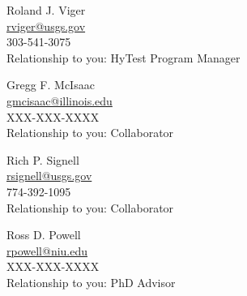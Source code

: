\documentclass[12pt]{article}
\begin{document}
\begin{multicols}{2}
\vspace{10pt}
Roland J. Viger\\
\url{rviger@usgs.gov} \\
303-541-3075\\
Relationship to you: HyTest Program Manager

\vspace{10pt}

Gregg F. McIsaac\\
\url{gmcisaac@illinois.edu}\\
XXX-XXX-XXXX\\
Relationship to you: Collaborator
   
\vspace{10pt}

Rich P. Signell\\
\url{rsignell@usgs.gov}\\
774-392-1095\\
Relationship to you: Collaborator

\vspace{10pt}

Ross D. Powell\\
\url{rpowell@niu.edu}\\
XXX-XXX-XXXX\\
Relationship to you: PhD Advisor



\end{multicols}
\end{document}
